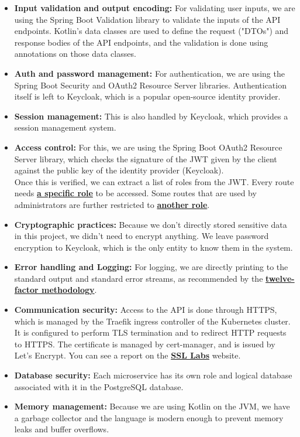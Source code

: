\documentclass[12pt,x11names]{article}
\begin{document}
\begin{itemize}
  \item \textbf{Input validation and output encoding:} For validating user inputs, we
  are using the Spring Boot Validation library to validate the inputs of the API
  endpoints. Kotlin's data classes are used to define the request ("DTOs") and response 
  bodies of the API endpoints, and the validation is done using annotations on those 
  data classes.
  \item \textbf{Auth and password management:} For authentication, we are using the Spring
  Boot Security and OAuth2 Resource Server libraries. Authentication itself is left to Keycloak,
  which is a popular open-source identity provider.
  \item \textbf{Session management:} This is also handled by Keycloak, which provides
  a session management system.
  \item \textbf{Access control:} For this, we are using the Spring Boot OAuth2 Resource
  Server library, which checks the signature of the JWT given by the client against the
  public key of the identity provider (Keycloak).
  \medskip \\
  Once this is verified, we can extract a list of roles from the JWT. Every route needs
  \href{https://github.com/thomas-mauran/LinkedOut/blob/04707ea2f0a31d8f8977ee31a2e7603779aae71f/backend/api_gateway/src/main/kotlin/com/linkedout/backend/config/SecurityConfig.kt#L24}{\textbf{a specific role}} 
  to be accessed. Some routes that are used by administrators are further restricted to
  \href{https://github.com/thomas-mauran/LinkedOut/blob/04707ea2f0a31d8f8977ee31a2e7603779aae71f/backend/api_gateway/src/main/kotlin/com/linkedout/backend/controller/ProfileController.kt#L59}{\textbf{another role}}.
  \item \textbf{Cryptographic practices:} Because we don't directly stored sensitive data in
  this project, we didn't need to encrypt anything. We leave password encryption to Keycloak,
  which is the only entity to know them in the system.
  \item \textbf{Error handling and Logging:} For logging, we are directly printing to the
  standard output and standard error streams, as recommended by the \href{https://12factor.net/logs}{\textbf{twelve-factor methodology}}.
  \item \textbf{Communication security:} Access to the API is done through HTTPS, which is
  managed by the Traefik ingress controller of the Kubernetes cluster. It is configured to
  perform TLS termination and to redirect HTTP requests to HTTPS. The certificate is managed
  by cert-manager, and is issued by Let's Encrypt. You can see a report on the \href{https://www.ssllabs.com/ssltest/analyze.html?d=linkedout.cluster%2d2020%2d5.dopolytech.fr&latest}{\textbf{SSL Labs}} website.
  \item \textbf{Database security:} Each microservice has its own role and logical database
  associated with it in the PostgreSQL database.
  \item \textbf{Memory management:} Because we are using Kotlin on the JVM, we have a 
  garbage collector and the language is modern enough to prevent memory leaks and buffer
  overflows.
\end{itemize}
\end{document}
